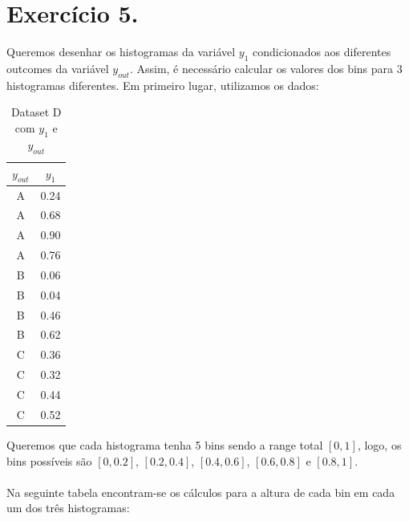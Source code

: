 \documentclass{article}
\begin{document}
\section{Exercício 5.}

Queremos desenhar os histogramas da variável $y_1$ condicionados aos diferentes outcomes da variável $y_{out}$. 
Assim, é necessário calcular os valores dos bins para 3 histogramas diferentes. Em primeiro lugar, utilizamos os dados:

\begin{table}[h!]
  \centering
  \begin{tabular}{|c|c|}
    \hline
    $y_{out}$ & $y_1$ \\ \hline
    A         & 0.24  \\ \hline
    A         & 0.68  \\ \hline
    A         & 0.90  \\ \hline
    A         & 0.76  \\ \hline
    B         & 0.06  \\ \hline
    B         & 0.04  \\ \hline
    B         & 0.46  \\ \hline
    B         & 0.62  \\ \hline
    C         & 0.36  \\ \hline
    C         & 0.32  \\ \hline
    C         & 0.44  \\ \hline
    C         & 0.52  \\ \hline
  \end{tabular}
  \caption{Dataset D com $y_1$ e $y_{out}$}
  \label{tab:datasetD_y1_yout}
\end{table}

Queremos que cada histograma tenha 5 bins sendo a range total $[0,1]$, logo, os bins possíveis são $[0, 0.2]$, $[0.2, 0.4]$, $[0.4, 0.6]$, $[0.6, 0.8]$ e $[0.8, 1]$.
\paragraph{}
Na seguinte tabela encontram-se os cálculos para a altura de cada bin em cada um dos três histogramas:
\end{document}
